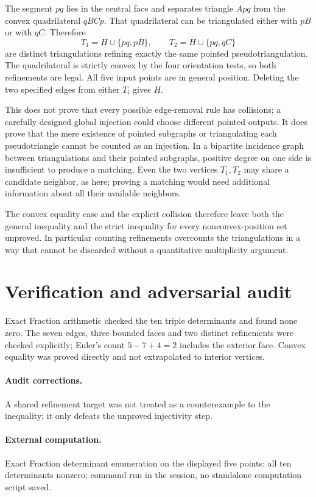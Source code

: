\documentclass[11pt,a4paper]{article}
\begin{document}
The segment $pq$ lies in the central face and separates triangle $Apq$ from
the convex quadrilateral $qBCp$. That quadrilateral can be triangulated either
with $pB$ or with $qC$. Therefore
\[
 T_1=H\cup\{pq,pB\},\qquad T_2=H\cup\{pq,qC\}
\]
are distinct triangulations refining exactly the same pointed pseudotriangulation.
The quadrilateral is strictly convex by the four orientation tests, so both
refinements are legal. All five input points are in general position.
Deleting the two specified edges from either $T_i$ gives $H$.

This does not prove that every possible edge-removal rule has collisions; a
carefully designed global injection could choose different pointed outputs.
It does prove that the mere existence of pointed subgraphs or triangulating
each pseudotriangle cannot be counted as an injection. In a bipartite incidence
graph between triangulations and their pointed subgraphs, positive degree on
one side is insufficient to produce a matching. Even the two vertices
$T_1,T_2$ may share a candidate neighbor, as here; proving a matching would
need additional information about all their available neighbors.

The convex equality case and the explicit collision therefore leave both the
general inequality and the strict inequality for every nonconvex-position set
unproved. In particular counting refinements overcounts the triangulations in
a way that cannot be discarded without a quantitative multiplicity argument.
\section{Verification and adversarial audit}
Exact Fraction arithmetic checked the ten triple determinants and found
none zero. The seven edges, three bounded faces and two distinct refinements
were checked explicitly; Euler's count $5-7+4=2$ includes the exterior face.
Convex equality was proved directly and not extrapolated to interior vertices.
\paragraph{Audit corrections.} A shared refinement target was not treated as a counterexample to the inequality; it only defeats the unproved injectivity step.
\paragraph{External computation.} Exact Fraction determinant enumeration on the displayed five points: all ten determinants nonzero; command run in the session, no standalone computation script saved.
\end{document}
